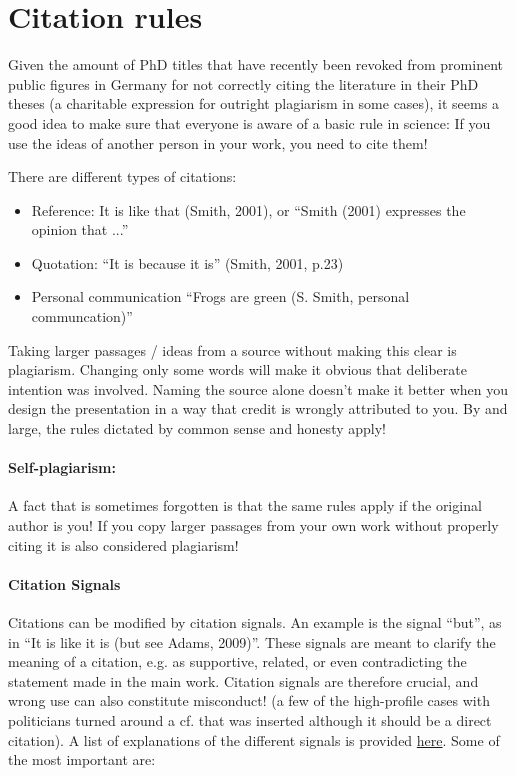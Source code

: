 \documentclass{tufte-book}
\begin{document}
\section{Citation rules}

Given the amount of PhD titles that have recently been revoked from prominent public figures in Germany for not correctly citing the literature in their PhD theses (a charitable expression for outright plagiarism in some cases), it seems a good idea to make sure that everyone is aware of a basic rule in science: If you use the ideas of another person in your work, you need to cite them!

There are different types of citations:

\begin{itemize}
\item Reference: It is like that (Smith, 2001), or ``Smith (2001) expresses the opinion that ...''
\item Quotation: ``It is because it is'' (Smith, 2001, p.23)
\item Personal communication ``Frogs are green (S. Smith, personal communcation)''
\end{itemize}

Taking larger passages / ideas from a source without making this clear is plagiarism. Changing only some words will make it obvious that deliberate intention was involved. Naming the source alone doesn’t make it better when you design the presentation in a way that credit is wrongly attributed to you. By and large, the rules dictated by common sense and honesty apply!

\paragraph{Self-plagiarism:} A fact that is sometimes forgotten is that the same rules apply if the original author is you! If you copy larger passages from your own work without properly citing it is also considered plagiarism! 

\paragraph{Citation Signals} Citations can be modified by citation signals. An example is the signal ``but'', as in ``It is like it is (but see Adams, 2009)''. These signals are meant to clarify the meaning of a citation, e.g. as supportive, related, or even contradicting the statement made in the main work. Citation signals are therefore crucial, and wrong use can also constitute misconduct! (a few of the high-profile cases with politicians turned around a cf. that was inserted although it should be a direct citation). A list of explanations of the different signals is provided \href{http://en.wikipedia.org/wiki/Citation_signal}{here}. Some of the most important are:
\end{document}
